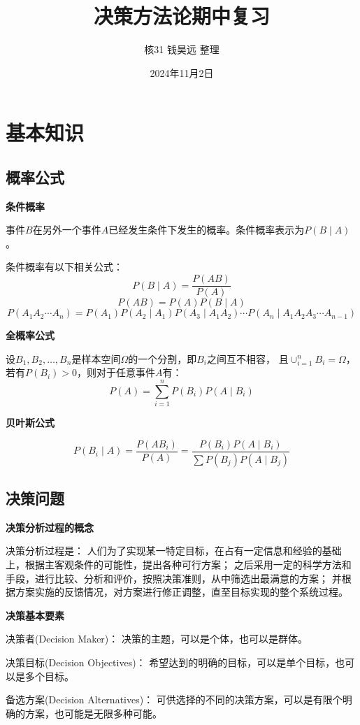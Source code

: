 \documentclass[a4paper,12pt]{article}
\title{决策方法论期中复习}
\author{核31\kern 36pt 钱昊远\kern 12pt 整理}
\date{2024年11月2日}
\begin{document}
\maketitle

\section{基本知识}

\subsection{概率公式}

\noindent
\textbf{条件概率}

事件$B$在另外一个事件$A$已经发生条件下发生的概率。条件概率表示为$P(B\mid A)$。

条件概率有以下相关公式：
$$
P(B \mid A)= \frac{P(AB)}{P(A)}
$$
$$
P(AB)=P(A)P(B \mid A)
$$
$$
P(A_{1}A_{2}\cdots A_{n})=P(A_{1})P(A_{2} \mid A_{1})P(A_{3} \mid A_{1}A_{2})
\cdots P(A_{n} \mid A_{1}A_{2}A_{3}\cdots A_{n-1})
$$

\noindent
\textbf{全概率公式}

设$B_{1},B_{2},\dots ,B_{n}$是样本空间$\Omega$的一个分割，即$B_{i}$之间互不相容，
且$\cup _{i=1}^{n}B_{i}=\Omega$，若有$P(B_{i})>0$，则对于任意事件$A$有：
$$
P(A)=\sum_{i=1}^{n}P(B_{i})P(A \mid B_{i})
$$

\noindent
\textbf{贝叶斯公式}

$$
P(B_{i} \mid A)=\frac{P(AB_{i})}{P(A)}=\frac{P(B_{i})P(A \mid B_{i})}{\sum P(B_{j})P(A \mid B_{j})}
$$

\subsection{决策问题}

\noindent
\textbf{决策分析过程的概念}

决策分析过程是：
人们为了实现某一特定目标，在占有一定信息和经验的基础上，根据主客观条件的可能性，提出各种可行方案；
之后采用一定的科学方法和手段，进行比较、分析和评价，按照决策准则，从中筛选出最满意的方案；
并根据方案实施的反馈情况，对方案进行修正调整，直至目标实现的整个系统过程。

\noindent
\textbf{决策基本要素}

决策者(Decision Maker)：
决策的主题，可以是个体，也可以是群体。

决策目标(Decision Objectives)：
希望达到的明确的目标，可以是单个目标，也可以是多个目标。

备选方案(Decision Alternatives)：
可供选择的不同的决策方案，可以是有限个明确的方案，也可能是无限多种可能。
\end{document}
